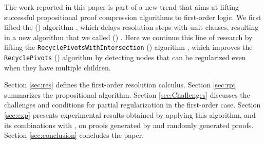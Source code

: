 The work reported in this paper is part of a new trend that aims at lifting successful propositional proof compression algorithms to first-order logic. %
We first lifted the {\LowerUnits} ({\LU}) algorithm \cite{LURPI}, which delays resolution steps with unit clauses, resulting in a new algorithm that we called
{\SFOLowerUnits} 
({\GFOLU}) \cite{GFOLU}. Here we continue this line of research by lifting the 
\texttt{Recycle\-PivotsWithIntersection}
({\RPI}) algorithm \cite{LURPI}, which improves the \texttt{RecyclePivots} ({\RP}) algorithm \cite{RP08} by detecting nodes that can be regularized even when they have multiple children. 


Section \ref{sec:res} defines the first-order resolution calculus. Section \ref{sec:rpi} summarizes the propositional {\RPI} algorithm. 
Section \ref{sec:Challenges} discusses the challenges and conditions for partial regularization in the first-order case.
Section \ref{sec:exp} presents experimental results obtained by applying this algorithm, and its combinations with {\GFOLU}, on proofs generated by {\SPASS} and randomly generated proofs. Section \ref{sec:conclusion} concludes the paper.


